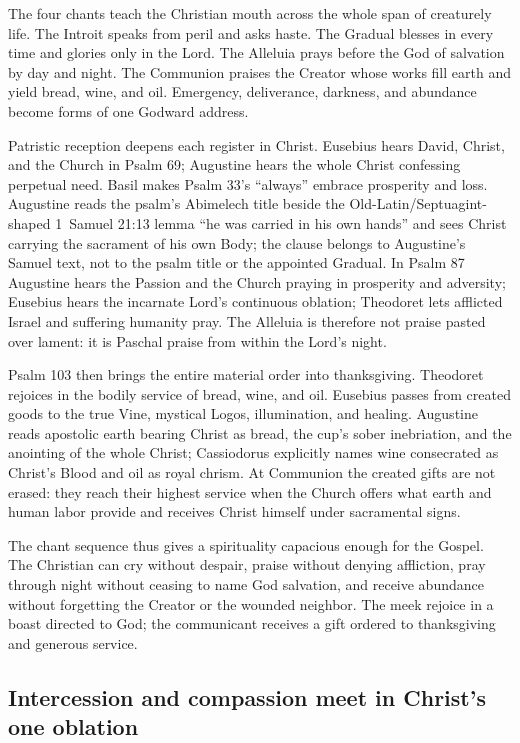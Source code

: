The four chants teach the Christian mouth across the whole span of creaturely
life. The Introit speaks from peril and asks haste. The Gradual blesses in
every time and glories only in the Lord. The Alleluia prays before the God of
salvation by day and night. The Communion praises the Creator whose works fill
earth and yield bread, wine, and oil. Emergency, deliverance, darkness, and
abundance become forms of one Godward address.

Patristic reception deepens each register in Christ. Eusebius hears David,
Christ, and the Church in Psalm 69; Augustine hears the whole Christ confessing
perpetual need. Basil makes Psalm 33's ``always'' embrace prosperity and loss.
Augustine reads the psalm's Abimelech title beside the Old-Latin/Septuagint-shaped
1~Samuel 21:13 lemma ``he was carried in his own hands'' and sees Christ
carrying the sacrament of his own Body; the clause belongs to Augustine's
Samuel text, not to the psalm title or the appointed Gradual. In Psalm 87
Augustine hears the Passion and the Church praying in
prosperity and adversity; Eusebius hears the incarnate Lord's continuous
oblation; Theodoret lets afflicted Israel and suffering humanity pray. The
Alleluia is therefore not praise pasted over lament: it is Paschal praise from
within the Lord's night.

Psalm 103 then brings the entire material order into thanksgiving. Theodoret
rejoices in the bodily service of bread, wine, and oil. Eusebius passes from
created goods to the true Vine, mystical Logos, illumination, and healing.
Augustine reads apostolic earth bearing Christ as bread, the cup's sober
inebriation, and the anointing of the whole Christ; Cassiodorus explicitly
names wine consecrated as Christ's Blood and oil as royal chrism. At Communion
the created gifts are not erased: they reach their highest service when the
Church offers what earth and human labor provide and receives Christ himself
under sacramental signs.

The chant sequence thus gives a spirituality capacious enough for the Gospel.
The Christian can cry without despair, praise without denying affliction, pray
through night without ceasing to name God salvation, and receive abundance
without forgetting the Creator or the wounded neighbor. The meek rejoice in a
boast directed to God; the communicant receives a gift ordered to thanksgiving
and generous service.

\subsection*{Intercession and compassion meet in Christ's one oblation \enspace{}}

